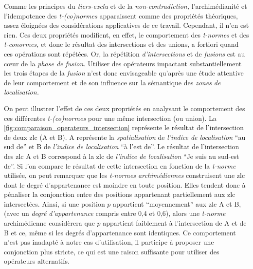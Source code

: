 Comme les principes du \emph{tiers-exclu} et de la
\emph{non-contradiction,} l'archimédianité et l'idempotence des
\emph{t-(co)normes} apparaissent comme des propriétés théoriques,
assez éloignées des considérations applicatives de ce
travail. Cependant, il n'en est rien. Ces deux propriétés modifient,
en effet, le comportement des \emph{t-normes} et des
\emph{t-conormes,} et donc le résultat des intersections et des
unions, a fortiori quand ces opérations sont répétées. Or, la
répétition \emph{d'intersections} et de \emph{fusions} est au cœur de
la \emph{phase de fusion.} Utiliser des opérateurs impactant
substantiellement les trois étapes de la \emph{fusion} n'est donc
envisageable qu'après une étude attentive de leur comportement et de
son influence sur la sémantique des \emph{zones de localisation.}

On peut illustrer l'effet de ces deux propriétés en analysant le
comportement des ces différentes \emph{t-(co)normes} pour une même
intersection (ou union). La
\autoref{fig:comparaison_operateurs_intersection} représente le
résultat de l'intersection de deux \ac{zlc}
(\textcolor{RdBu-9-1}{\textsf{A}} et
\textcolor{RdBu-9-9}{\textsf{B}}). \textcolor{RdBu-9-1}{\textsf{A}}
représente la \emph{spatialisation} de \emph{l'indice de localisation}
\enquote{au sud de} et \textcolor{RdBu-9-9}{\textsf{B}} de
\emph{l'indice de localisation} \enquote{à l'est de}. Le résultat de
l'intersection des \ac{zlc} \textcolor{RdBu-9-1}{\textsf{A}} et
\textcolor{RdBu-9-9}{\textsf{B}} correspond à la \ac{zlc} de
\emph{l'indice de localisation} \enquote{Je suis au sud-est de}. Si
l'on compare le résultat de cette intersection en fonction de la
\emph{t-norme} utilisée, on peut remarquer que les \emph{t-normes
  archimédiennes} construisent une \ac{zlc} dont le degré
d'appartenance est moindre en toute position. Elles tendent donc à
pénaliser la conjonction entre des positions appartenant partiellement
aux \ac{zlc} intersectées. Ainsi, si une position \(p\) appartient
\enquote{moyennement} aux \ac{zlc} \textcolor{RdBu-9-1}{\textsf{A}} et
\textcolor{RdBu-9-9}{\textsf{B}}, (\eg avec un \emph{degré
  d’appartenance} compris entre 0,4 et 0,6), alors une \emph{t-norme}
archimédienne considèrera que \(p\) appartient faiblement à
l'intersection de \textcolor{RdBu-9-1}{\textsf{A}} et de
\textcolor{RdBu-9-9}{\textsf{B}} et ce, même si les degrés
d'appartenance sont identiques.
%
Ce comportement n'est pas
inadapté à notre cas d'utilisation, il participe à proposer une
conjonction plus stricte, ce qui est une raison suffisante pour
utiliser des opérateurs alternatifs.

